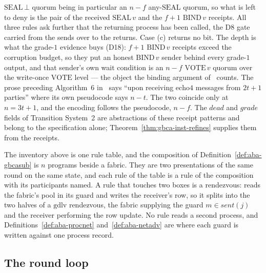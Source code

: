 $\mathrm{SEAL}\,\bot$ quorum being in particular an $n{-}f$ any-$\mathrm{SEAL}$
quorum, so what is left to deny is the pair of the received $\mathrm{SEAL}\,v$
and the $f{+}1$ $\mathrm{BIND}\,v$ receipts.
All three rules ask further that the returning process has been called, the D8
gate carried from the sends over to the returns.
Case (c) returns no bit.
The depth is what the grade-$1$ evidence buys (D18): $f{+}1$ $\mathrm{BIND}\,v$
receipts exceed the corruption budget, so they put an honest $\mathrm{BIND}\,v$
sender behind every grade-$1$ output, and that sender's own wait condition is an
$n{-}f$ $\mathrm{VOTE}\,v$ quorum over the write-once $\mathrm{VOTE}$ level ---
the object the binding argument of~\cite{ABDY22} counts.
The prose preceding Algorithm~6 in~\cite{ABDY22} says ``upon receiving
$\mathrm{echo4}$ messages from $2t+1$ parties'' where its own pseudocode says
$n - t$.
The two coincide only at $n = 3t+1$, and the encoding follows the pseudocode,
$n - f$.
The $dead$ and $grade$ fields of Transition System~2 are abstractions of these
receipt patterns and belong to the specification alone;
Theorem~\ref{thm:gbca-inst-refines} supplies them from the receipts.

The inventory above is one rule table, and the composition of
Definition~\ref{def:aba-gbcasub} is $n$ programs beside a fabric.
They are two presentations of the same round on the same state, and each rule of
the table is a rule of the composition with its participants named.
A rule that touches two boxes is a rendezvous:
 reads the fabric's pool
in its guard and writes the receiver's row, so it splits into the two halves of a
$\mathrm{gdlv}$ rendezvous, the fabric supplying the guard $m \in
\mathit{sent}(j)$ and the receiver performing the row update.
No rule reads a second process, and
Definitions~\ref{def:aba-procnet} and~\ref{def:aba-netadv} are where each guard
is written against one process record.

\subsection{The round loop}



